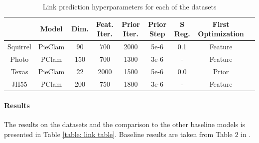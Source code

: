 \documentclass[letterpaper]{article} %
\begin{document}
\begin{table}[t]
    \centering
    \begin{tabular}{|c|c|c|c|c|c|c|c|c|}
        \hline
        &Model  & Dim. & Feat. Iter.  & Prior Iter. & Prior Step & S Reg. & First Optimization\\
        \hline
        Squirrel &  PieClam   &     90 &   700   & 2000 & 5e-6     & 0.1 & Feature   \\
        Photo    &  PClam     & 150    &  700    & 1300  & 3e-6  & - & Feature \\
        Texas    &   PieClam  &  22    &  2000   &   1500 & 5e-6 &  0.0& Prior       \\
        JH55     &   PClam    &   200 & 750     &  1800   & 3e-6   & - &Feature\\
        
        \hline
    \end{tabular}
    \caption{Link prediction hyperparameters for each of the datasets}
    \label{table: hypers table}
\end{table}




\paragraph{Results}
The results on the datasets and the comparison to the other baseline models is presented in Table \ref{table: link table}. Baseline results are taken from Table $2$ in \cite{zhou2022disenlink}.

\endgroup
\end{document}
